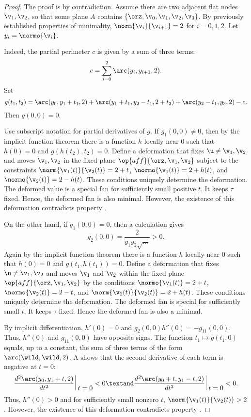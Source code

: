 \begin{proof}  The proof is by contradiction.
Assume there are two adjacent flat nodes $\v_1,\v_2$, so that
some plane $A$  contains $\{\orz,\v_0,\v_1,\v_2,\v_3\}$.
By previously established properties of minimality,
%
$\norm{\v_i}{\v_{i+1}}=2$ for $i=0,1,2$.  Let $y_i = \normo{\v_i}$.
%

  Indeed, the partial
perimeter $c$ is given by a sum of three terms:
\[ 
c=\sum_{i=0}^2\arc(y_i,y_{i+1},2).
\] 
Set
\[ 
  g(t_1,t_2) = \arc(y_0,y_1+t_1,2) 
+ \arc(y_1+t_1,y_2-t_1,2+t_2) + \arc(y_2-t_1,y_3,2) - c.
\] 
Then $g(0,0)=0$.  

Use subscript notation for partial derivatives of $g$.  If $g_1(0,0)
\ne 0$, then by the implicit function theorem there is a function $h$
locally near $0$ such that $h(0)=0$ and $g(h(t_2),t_2)=0$.  Define a
deformation that fixes $\u\ne\v_1,\v_2$ and moves $\v_1,\v_2$ in the
fixed plane $\op{aff}\{\orz,\v_1,\v_2\}$ subject to the constraints
$\norm{\v_1(t)}{\v_2(t)}=2+t$, $\normo{\v_1(t)} = 2+h(t)$, and
$\normo{\v_2(t)} = 2-h(t)$.  These conditions uniquely determine the
deformation.  The deformed value is a special fan for sufficiently
small positive $t$.  It keeps $\tau$ fixed.  Hence, the deformed fan is
also minimal.  However, the existence of this deformation contradicts
property .

On the other hand, if $ g_1(0,0) =0$, then a calculation gives
\[ g_2(0,0) = \dfrac{2}{y_1y_2\sqrt{\ldots}} >
0.\]  Again by the implicit function theorem there is
a function $h$ locally near $0$ such that $h(0)=0$ and
$g(t_1,h(t_1))=0$.  Define a deformation that fixes $\u\ne \v_1,\v_2$
and moves $\v_1$ and $\v_2$ within the fixed plane
$\op{aff}\{\orz,\v_1,\v_2\}$ by the conditions $\normo{\v_1(t)} = 2 +
t$, $\normo{\v_2(t)} = 2 - t$, and $\norm{\v_1(t)}{\v_2(t)}=2+h(t)$.
These conditions uniquely determine the deformation.  The deformed fan
is special for sufficiently small $t$.  It keeps $\tau$ fixed.  Hence
the deformed fan is also a minimal.

By implicit differentiation, $h'(0) = 0$ and $g_2(0,0) h''(0) =
-g_{11}(0,0)$.  Thus, $h''(0)$ and $g_{11}(0,0)$ have opposite signs.
The function $t_1\mapsto g(t_1,0)$ equals, up to a constant, the sum
of three terms of the form $\arc(\wild,\wild,2)$.
A  shows that the second derivative of each
term  is negative at $t=0$:
\begin{equation}\label{eqn:arc''}
\def\vt{\vrule_{\relax{\raisebox{-0.55em}{\ensuremath{\displaystyle{~t=0}}}}}}
\frac{d^2 \arc(y_0,y_1+t,2)}{d t^2}\,\vt < 0\textand
\dfrac{d^2 \arc(y_0+t,y_1-t,2)}{d t^2}\,\vt < 0.
\end{equation}  
Thus, $h''(0)>0$
and for sufficiently small nonzero $t$, $\norm{\v_1(t)}{\v_2(t)}>2$.
However, the existence of this deformation contradicts property
.
\end{proof}
